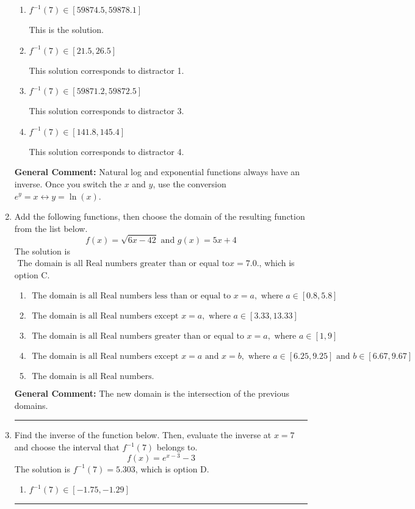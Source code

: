 \documentclass{extbook}[14pt]
\newcommand{\litem}[1]{\item #1

\rule{\textwidth}{0.4pt}}
\begin{document}
\begin{enumerate}
{\begin{enumerate}[label=\Alph*.]
 This solution corresponds to distractor 2.
\item \( f^{-1}(7) \in [59874.5, 59878.1] \)

 This is the solution.
\item \( f^{-1}(7) \in [21.5, 26.5] \)

 This solution corresponds to distractor 1.
\item \( f^{-1}(7) \in [59871.2, 59872.5] \)

 This solution corresponds to distractor 3.
\item \( f^{-1}(7) \in [141.8, 145.4] \)

 This solution corresponds to distractor 4.
\end{enumerate}

\textbf{General Comment:} Natural log and exponential functions always have an inverse. Once you switch the $x$ and $y$, use the conversion $ e^y = x \leftrightarrow y=\ln(x)$.
}
\litem{
Add the following functions, then choose the domain of the resulting function from the list below.
\[ f(x) = \sqrt{6x-42}  \text{ and } g(x) = 5x + 4 \]The solution is \( \text{ The domain is all Real numbers greater than or equal to} x = 7.0. \), which is option C.\begin{enumerate}[label=\Alph*.]
\item \( \text{ The domain is all Real numbers less than or equal to } x = a, \text{ where } a \in [0.8, 5.8] \)


\item \( \text{ The domain is all Real numbers except } x = a, \text{ where } a \in [3.33, 13.33] \)


\item \( \text{ The domain is all Real numbers greater than or equal to } x = a, \text{ where } a \in [1, 9] \)


\item \( \text{ The domain is all Real numbers except } x = a \text{ and } x = b, \text{ where } a \in [6.25, 9.25] \text{ and } b \in [6.67, 9.67] \)


\item \( \text{ The domain is all Real numbers. } \)


\end{enumerate}

\textbf{General Comment:} The new domain is the intersection of the previous domains.
}
\litem{
Find the inverse of the function below. Then, evaluate the inverse at $x = 7$ and choose the interval that $f^{-1}(7)$ belongs to.
\[ f(x) = e^{x-3}-3 \]The solution is \( f^{-1}(7) = 5.303 \), which is option D.\begin{enumerate}[label=\Alph*.]
\item \( f^{-1}(7) \in [-1.75, -1.29] \)


\end{enumerate}}
\end{enumerate}
\end{document}

